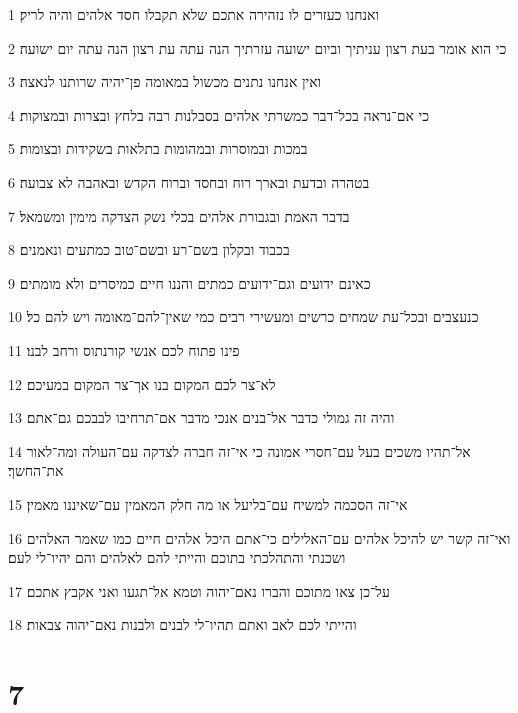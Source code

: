 \par 1 ואנחנו כעזרים לו נזהירה אתכם שלא תקבלו חסד אלהים והיה לריק׃
\par 2 כי הוא אומר בעת רצון עניתיך וביום ישועה עזרתיך הנה עתה עת רצון הנה עתה יום ישועה׃
\par 3 ואין אנחנו נתנים מכשול במאומה פן־יהיה שרותנו לנאצה׃
\par 4 כי אם־נראה בכל־דבר כמשרתי אלהים בסבלנות רבה בלחץ ובצרות ובמצוקות׃
\par 5 במכות ובמוסרות ובמהומות בתלאות בשקידות ובצומות׃
\par 6 בטהרה ובדעת ובארך רוח ובחסד וברוח הקדש ובאהבה לא צבועה׃
\par 7 בדבר האמת ובגבורת אלהים בכלי נשק הצדקה מימין ומשמאל׃
\par 8 בכבוד ובקלון בשם־רע ובשם־טוב כמתעים ונאמנים׃
\par 9 כאינם ידועים וגם־ידועים כמתים והננו חיים כמיסרים ולא מומתים׃
\par 10 כנעצבים ובכל־עת שמחים כרשים ומעשירי רבים כמי שאין־להם־מאומה ויש להם כל׃
\par 11 פינו פתוח לכם אנשי קורנתוס ורחב לבנו׃
\par 12 לא־צר לכם המקום בנו אך־צר המקום במעיכם׃
\par 13 והיה זה גמולי כדבר אל־בנים אנכי מדבר אם־תרחיבו לבבכם גם־אתם׃
\par 14 אל־תהיו משכים בעל עם־חסרי אמונה כי אי־זה חברה לצדקה עם־העולה ומה־לאור את־החשך׃
\par 15 אי־זה הסכמה למשיח עם־בליעל או מה חלק המאמין עם־שאיננו מאמין׃
\par 16 ואי־זה קשר יש להיכל אלהים עם־האלילים כי־אתם היכל אלהים חיים כמו שאמר האלהים ושכנתי והתהלכתי בתוכם והייתי להם לאלהים והם יהיו־לי לעם׃
\par 17 על־כן צאו מתוכם והברו נאם־יהוה וטמא אל־תגעו ואני אקבץ אתכם׃
\par 18 והייתי לכם לאב ואתם תהיו־לי לבנים ולבנות נאם־יהוה צבאות׃

\chapter{7}

